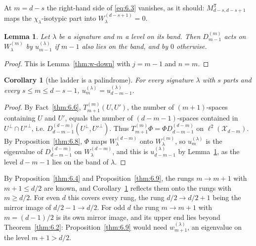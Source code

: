 \documentclass[11pt]{article}
\numberwithin{equation}{section}
\theoremstyle{plain}
\newtheorem{corollary}[theorem]{Corollary}
\newtheorem{lemma}[theorem]{Lemma}
\theoremstyle{definition}
\begin{document}
At $m=d-s$ the right-hand side of \eqref{eq:6.3} vanishes, as it should: $M_{d-s,d-s+1}^{\mathsf
T}$ maps the $\chi_\lambda$-isotypic part into $W^{(d-s+1)}_\lambda=0$.

\begin{lemma}\label{thm:6.10}
Let $\lambda$ be a signature and $m$ a level on its band. Then
$D^{(m)}_{m-1}$ acts on $W^{(m)}_\lambda$ by $u^{(\lambda)}_{m-1}$ if $m-1$ also lies on the
band, and by $0$ otherwise.
\end{lemma}

\begin{proof}
This is Lemma~\ref{thm:w-down} with $j=m-1$ and $n=m$.
\end{proof}

\begin{corollary}[the ladder is a palindrome]\label{thm:6.11}
For every signature $\lambda$ with $s$ parts and every $s\le m\le d-s-1$,
$u^{(\lambda)}_m=u^{(\lambda)}_{d-m-1}$.
\end{corollary}

\begin{proof}
By Fact~\ref{thm:6.6}, $T^{(m)}_{m+1}(U,U')$, the number of $(m+1)$-spaces containing
$U$ and $U'$, equals the number of $(d-m-1)$-spaces contained in
$U^\perp\cap U'^\perp$, i.e. $D^{(d-m)}_{d-m-1}(U^\perp,U'^\perp)$. Thus
$T^{(m)}_{m+1}\Phi=\Phi D^{(d-m)}_{d-m-1}$ on $\ell^2(\mathcal{X}_{d-m})$. By
Proposition~\ref{thm:6.8}, $\Phi$ maps $W^{(d-m)}_\lambda$ onto
$W^{(m)}_\lambda$, so $u^{(\lambda)}_m$ is the eigenvalue of $D^{(d-m)}_{d-m-1}$ on
$W^{(d-m)}_\lambda$, and this is $u^{(\lambda)}_{d-m-1}$ by Lemma~\ref{thm:6.10}, as the level $d-m-1$
lies on the band of $\lambda$.
\end{proof}

By Proposition~\ref{thm:6.4} and Proposition~\ref{thm:6.9}, the rungs $m\to m+1$ with
$m+1\le d/2$ are known, and Corollary~\ref{thm:6.11} reflects them onto the rungs with
$m\ge d/2$. For even $d$ this covers every rung, the rung $d/2\to d/2+1$ being the mirror
image of $d/2-1\to d/2$. For odd $d$ the rung $m\to m+1$ with $m=(d-1)/2$ is its own
mirror image, and its upper end lies beyond Theorem~\ref{thm:6.2}: Proposition~\ref{thm:6.9}
would need $w^{(\lambda)}_{m+1}$, an eigenvalue on the level $m+1>d/2$.
\end{document}
